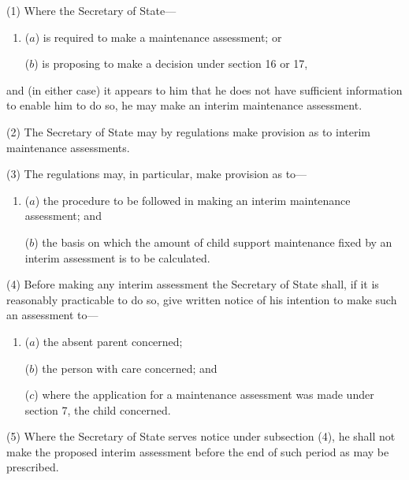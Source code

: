 \documentclass[12pt,a4paper]{article}
\begin{document}
(1) Where the Secretary of State—
\begin{enumerate}\item[]
($a$) is required to make a maintenance assessment; or

($b$) is proposing to make a decision under section 16 or 17,
\end{enumerate}
and (in either case) it appears to him that he does not have sufficient information to enable him to do so, he may make an interim maintenance assessment.

(2) The Secretary of State may by regulations make provision as to interim maintenance assessments.

(3) The regulations may, in particular, make provision as to—
\begin{enumerate}\item[]
($a$) the procedure to be followed in making an interim maintenance assessment; and

($b$) the basis on which the amount of child support maintenance fixed by an interim assessment is to be calculated.
\end{enumerate}

(4) Before making any interim assessment 
the Secretary of State  %
shall, if it is reasonably practicable to do so, give written notice of his intention to make such an assessment to—
\begin{enumerate}\item[]
($a$) the absent parent concerned;

($b$) the person with care concerned; and

($c$) where the application for a maintenance assessment was made under section 7, the child concerned.
\end{enumerate}

(5) Where 
the Secretary of State  %
serves notice under subsection (4), he shall not make the proposed interim assessment before the end of such period as may be prescribed.

\end{document}
